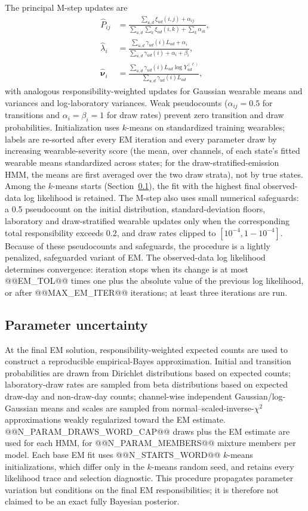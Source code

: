 \documentclass{ieeeaccess}
\newcommand{\vect}[1]{\bm{#1}}
\begin{document}
The principal M-step updates are
\begin{align}
\widehat P_{ij}&=
\frac{\sum_{u,d}\xi_{ud}(i,j)+\alpha_{ij}}
{\sum_{u,d}\sum_k\xi_{ud}(i,k)+\sum_k \alpha_{ik}},\label{eq:Pupdate}\\
\widehat\lambda_i&=
\frac{\sum_{u,d}\gamma_{ud}(i)L_{ud}+\alpha_i}
{\sum_{u,d}\gamma_{ud}(i)+\alpha_i+\beta_i},\label{eq:lamupdate}\\
\widehat{\vect{\nu}}_i&=
\frac{\sum_{u,d}\gamma_{ud}(i)L_{ud}\log Y_{ud}^{(\ell)}}
{\sum_{u,d}\gamma_{ud}(i)L_{ud}},\label{eq:labupdate}
\end{align}
with analogous responsibility-weighted updates for Gaussian wearable means and variances and log-laboratory variances. Weak pseudocounts ($\alpha_{ij}=0.5$ for transitions and $\alpha_i=\beta_i=1$ for draw rates) prevent zero transition and draw probabilities. Initialization uses $k$\nobreakdash-means on standardized training wearables; labels are re-sorted after every EM iteration and every parameter draw by increasing wearable-severity score (the mean, over channels, of each state's fitted wearable means standardized across states; for the draw-stratified-emission HMM, the means are first averaged over the two draw strata), not by true states. Among the $k$\nobreakdash-means starts (Section~\ref{sec:paramunc}), the fit with the highest final observed-data log likelihood is retained. The M-step also uses small numerical safeguards: a 0.5 pseudocount on the initial distribution, standard-deviation floors, laboratory and draw-stratified wearable updates only when the corresponding total responsibility exceeds 0.2, and draw rates clipped to $[10^{-4},1-10^{-4}]$. Because of these pseudocounts and safeguards, the procedure is a lightly penalized, safeguarded variant of EM. The observed-data log likelihood determines convergence: iteration stops when its change is at most @@EM_TOL@@ times one plus the absolute value of the previous log likelihood, or after @@MAX_EM_ITER@@ iterations; at least three iterations are run.

\subsection{Parameter uncertainty}\label{sec:paramunc}
At the final EM solution, responsibility-weighted expected counts are used to construct a reproducible empirical-Bayes approximation. Initial and transition probabilities are drawn from Dirichlet distributions based on expected counts; laboratory-draw rates are sampled from beta distributions based on expected draw-day and non-draw-day counts; channel-wise independent Gaussian/log-Gaussian means and scales are sampled from normal--scaled-inverse-$\chi^2$ approximations weakly regularized toward the EM estimate. @@N_PARAM_DRAWS_WORD_CAP@@ draws plus the EM estimate are used for each HMM, for @@N_PARAM_MEMBERS@@ mixture members per model. Each base EM fit uses @@N_STARTS_WORD@@ $k$\nobreakdash-means initializations, which differ only in the $k$\nobreakdash-means random seed, and retains every likelihood trace and selection diagnostic. This procedure propagates parameter variation but conditions on the final EM responsibilities; it is therefore not claimed to be an exact fully Bayesian posterior.
\end{document}
